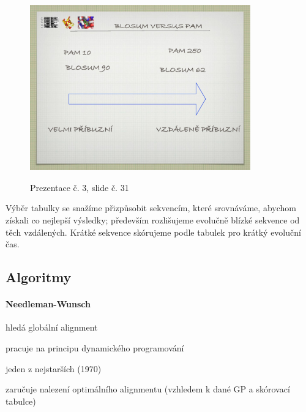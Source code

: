 \documentclass[DIV=8]{scrreprt}
\begin{document}
\begin{figure}
    \caption{Prezentace č. 3, slide č. 31}
    \includegraphics[width=0.85\textwidth]{slides-3/slide-31.jpg}
    \centering
    \label{slides-3-slide-31}
\end{figure}


Výběr tabulky se snažíme přizpůsobit sekvencím, které srovnáváme, abychom získali co nejlepší výsledky; především rozlišujeme evolučně blízké sekvence od těch vzdálených. Krátké sekvence skórujeme podle tabulek pro krátký evoluční čas.

\subsection{Algoritmy} \label{Algoritmy}


\paragraph{Needleman-Wunsch}
\begin{myItemize}[nosep]
    \item hledá globální alignment
    \item pracuje na principu dynamického programování
    \item jeden z nejstarších (1970)
    \item zaručuje nalezení optimálního alignmentu (vzhledem k dané GP a skórovací tabulce)
\end{myItemize}
\end{document}
